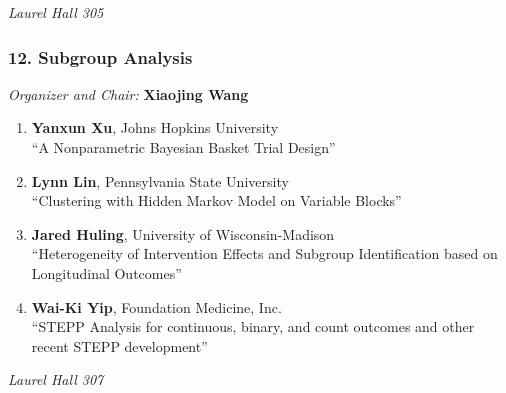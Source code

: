 \emph{Laurel Hall 305} \\[.5em]

\subsubsection*{12. Subgroup Analysis}

\emph{Organizer and Chair:} \textbf{Xiaojing Wang}

\begin{enumerate}
\item \textbf{Yanxun Xu}, Johns Hopkins University \\
``A Nonparametric Bayesian Basket Trial Design''
\item \textbf{Lynn Lin}, Pennsylvania State University \\
``Clustering with Hidden Markov Model on Variable Blocks''
\item \textbf{Jared Huling}, University of Wisconsin-Madison \\
``Heterogeneity of Intervention Effects and Subgroup Identification based on Longitudinal Outcomes''
\item \textbf{Wai-Ki Yip}, Foundation Medicine, Inc. \\
``STEPP Analysis for continuous, binary, and count outcomes and other recent STEPP development''
\end{enumerate}

\emph{Laurel Hall 307} \\[.5em]

